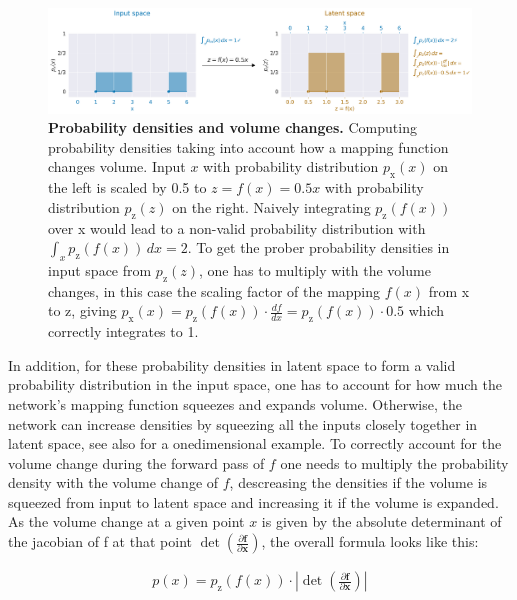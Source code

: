 \begin{figure}[ht]
    \myfloatalign
    \includegraphics[width=1\linewidth]{images/change-of-volume.png}
    \caption[Volume change illustration]{
\textbf{Probability densities and volume changes.} Computing probability densities taking into account how a mapping function changes volume. Input $x$ with probability distribution $p_\text{x}(x)$
on the left is scaled by 0.5 to $z=f(x)=0.5x$ with probability
distribution $p_\text{z}(z)$ on the right. Naively integrating
$p_\text{z}(f(x))$ over x would lead to a non-valid probability
distribution with $\int_x p_\mathrm{z}(f(x)) \, dx=2$. To get the
prober probability densities in input space from $p_\text{z}(z)$, one
has to multiply with the volume changes, in this case the scaling factor
of the mapping $f(x)$ from x to z, giving
$p_\text{x}(x)=p_\mathrm{z}(f(x)) \cdot \frac{df}{dx}=p_\mathrm{z}(f(x))\cdot 0.5$
which correctly integrates to 1.
}
\label{change-of-volume-fig}
\end{figure}



    In addition, for these probability densities in latent space to form a
valid probability distribution in the input space, one has to account
for how much the network's mapping function squeezes and expands volume.
Otherwise, the network can increase densities by squeezing all the
inputs closely together in latent space, see also
 for a onedimensional example. To
correctly account for the volume change during the forward pass of $f$
one needs to multiply the probability density with the volume change of
$f$, descreasing the densities if the volume is squeezed from input to
latent space and increasing it if the volume is expanded. As the volume
change at a given point $x$ is given by the absolute determinant of
the jacobian of f at that point
$\det \left( \frac{\partial \mathbf{f}}{\partial \mathbf{x}} \right)$,
the overall formula looks like this:

\begin{align}
p(x) = p_\textrm{z}(f(x)) \cdot | \det \left( \frac{\partial \mathbf{f}}{\partial \mathbf{x}} \right)|
\end{align}

